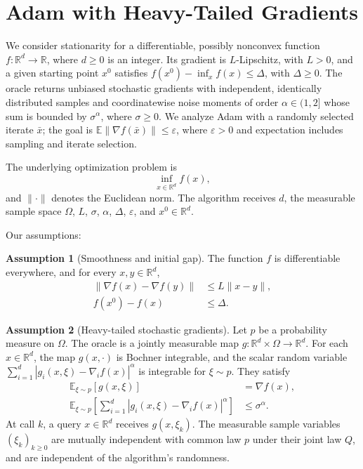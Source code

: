 \documentclass[10pt]{article}
\theoremstyle{definition}
\newtheorem{assumption}{Assumption}
\begin{document}
\section*{Adam with Heavy-Tailed Gradients}
We consider stationarity for a differentiable, possibly nonconvex function $f:\mathbb{R}^d\to\mathbb{R}$, where $d\geq0$ is an integer. Its gradient is $L$-Lipschitz, with $L>0$, and a given starting point $x^0$ satisfies $f(x^0)-\inf_x f(x)\leq\Delta$, with $\Delta\geq0$. The oracle returns unbiased stochastic gradients with independent, identically distributed samples and coordinatewise noise moments of order $\alpha\in(1,2]$ whose sum is bounded by $\sigma^\alpha$, where $\sigma\geq0$. We analyze Adam with a randomly selected iterate $\bar{x}$; the goal is $\mathbb{E}\|\nabla f(\bar{x})\|\leq\varepsilon$, where $\varepsilon>0$ and expectation includes sampling and iterate selection.

The underlying optimization problem is
\[
\inf_{x\in\mathbb{R}^d} f(x),
\]
and $\|\cdot\|$ denotes the Euclidean norm. The algorithm receives $d$, the measurable sample space $\Omega$, $L$, $\sigma$, $\alpha$, $\Delta$, $\varepsilon$, and $x^0\in\mathbb{R}^d$.

Our assumptions:
\begin{assumption}[Smoothness and initial gap]
The function $f$ is differentiable everywhere, and for every $x,y\in\mathbb{R}^d$,
\[
\begin{aligned}
\|\nabla f(x)-\nabla f(y)\|&\leq L\|x-y\|,\\
f(x^0)-f(x)&\leq\Delta.
\end{aligned}
\]
\end{assumption}

\begin{assumption}[Heavy-tailed stochastic gradients]
Let $p$ be a probability measure on $\Omega$. The oracle is a jointly measurable map $g:\mathbb{R}^d\times\Omega\to\mathbb{R}^d$. For each $x\in\mathbb{R}^d$, the map $g(x,\cdot)$ is Bochner integrable, and the scalar random variable $\sum_{i=1}^d |g_i(x,\xi)-\nabla_i f(x)|^\alpha$ is integrable for $\xi\sim p$. They satisfy
\[
\begin{aligned}
\mathbb{E}_{\xi\sim p}[g(x,\xi)]&=\nabla f(x),\\
\mathbb{E}_{\xi\sim p}\left[
\sum_{i=1}^d |g_i(x,\xi)-\nabla_i f(x)|^\alpha
\right]&\leq\sigma^\alpha.
\end{aligned}
\]
At call $k$, a query $x\in\mathbb{R}^d$ receives $g(x,\xi_k)$. The measurable sample variables $(\xi_k)_{k\geq0}$ are mutually independent with common law $p$ under their joint law $Q$, and are independent of the algorithm's randomness.
\end{assumption}
\end{document}
